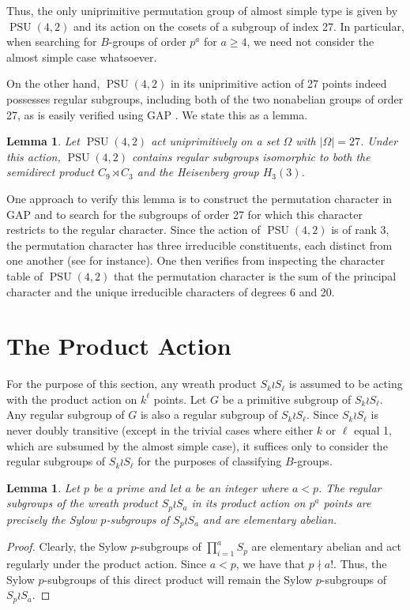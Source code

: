 \documentclass[12pt]{amsart}
\newtheorem{lemma}[theorem]{Lemma}
\theoremstyle{definition}
\DeclareMathOperator{\PSU}{PSU}
\begin{document}
Thus, the only uniprimitive permutation group of almost simple type is given by $\PSU(4,2)$ and its action on the cosets of a subgroup of index 27. In particular, when searching for $B$-groups of order $p^a$ for $a \geq 4$, we need not consider the almost simple case whatsoever.

On the other hand, $\PSU(4,2)$ in its uniprimitive action of 27 points indeed possesses regular subgroups, including both of the two nonabelian groups of order 27, as is easily verified using GAP \cite{Gap}. We state this as a lemma.

\begin{lemma}\label{reg-of-PSU42}
	Let $\PSU(4,2)$ act uniprimitively on a set $\Omega$ with $|\Omega| = 27$. Under this action, $\PSU(4,2)$ contains regular subgroups isomorphic to both the semidirect product $C_9 \rtimes C_3$ and the Heisenberg group $H_3(3)$.
\end{lemma}

One approach to verify this lemma is to construct the permutation character in GAP and to search for the subgroups of order 27 for which this character restricts to the regular character. Since the action of $\PSU(4,2)$ is of rank 3, the permutation character has three irreducible constituents, each distinct from one another (see \cite[Corollary 5.16]{Is} for instance). One then verifies from inspecting the character table of $\PSU(4,2)$ that the permutation character is the sum of the principal character and the unique irreducible characters of degrees 6 and 20.


	
\section{The Product Action}

For the purpose of this section, any wreath product $S_k \wr S_\ell$ is assumed to be acting with the product action on $k^\ell$ points. Let $G$ be a primitive subgroup of $S_k \wr S_\ell$. Any regular subgroup of $G$ is also a regular subgroup of $S_k \wr S_\ell$. Since $S_k \wr S_\ell$ is never doubly transitive (except in the trivial cases where either $k$ or $\ell$ equal 1, which are subsumed by the almost simple case), it suffices only to consider the regular subgroups of $S_k \wr S_\ell$ for the purposes of classifying $B$-groups.

\begin{lemma}
	Let $p$ be a prime and let $a$ be an integer where $a < p$. The regular subgroups of the wreath product $S_p \wr S_a$ in its product action on $p^a$ points are precisely the Sylow $p$-subgroups of $S_p \wr S_a$ and are elementary abelian.
\end{lemma}
\begin{proof}
	Clearly, the Sylow $p$-subgroups of $\prod_{i=1}^a S_p$ are elementary abelian and act regularly under the product action. Since $a < p$, we have that $p \nmid a!$. Thus, the Sylow $p$-subgroups of this direct product will remain the Sylow $p$-subgroups of $S_p \wr S_a$.
\end{proof}
\end{document}
